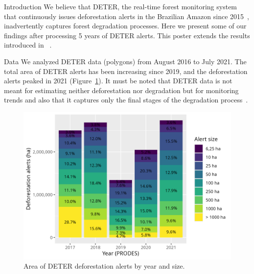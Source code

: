 \documentclass[20pt]{beamer}
\begin{document}
\vspace*{-2cm}
\begin{frame}[fragile,t]
\begin{columns}[t]




\begin{column}{0.33\linewidth}

\vspace{0.5cm}

    \begin{block}{Introduction\vphantom{g}}
        We believe that DETER, the real-time forest monitoring system that continuously issues deforestation alerts in the Brazilian Amazon since 2015~\cite{diniz2015a}, inadvertently captures forest degradation processes.
        Here we present some of our findings after processing 5 years of DETER alerts.
        This poster extends the results introduced in ~\cite{sanchez2023}.
    \end{block}

\vspace{0.5cm}

    \begin{block}{Data}
        We analyzed DETER data (polygons) from August 2016 to July 2021.
        The total area of DETER alerts has been increasing since 2019, and the deforestation alerts peaked in 2021 (Figure~\ref{fig:deter_warnings_area_size}).
        It must be noted that DETER data is not meant for estimating neither deforestation nor degradation but for monitoring trends and also that it captures only the final stages of the degradation process~\cite{dealmeida2022}.

\begin{figure}[h] 
    \begin{center}
    \includegraphics[width=\linewidth]{./figures/deter_warnings_area_size.png}
        \caption{Area of DETER deforestation alerts by year and size.}
    \label{fig:deter_warnings_area_size}
    \end{center}
\end{figure}


\end{block}
\end{column}
\end{columns}
\end{frame}
\end{document}
